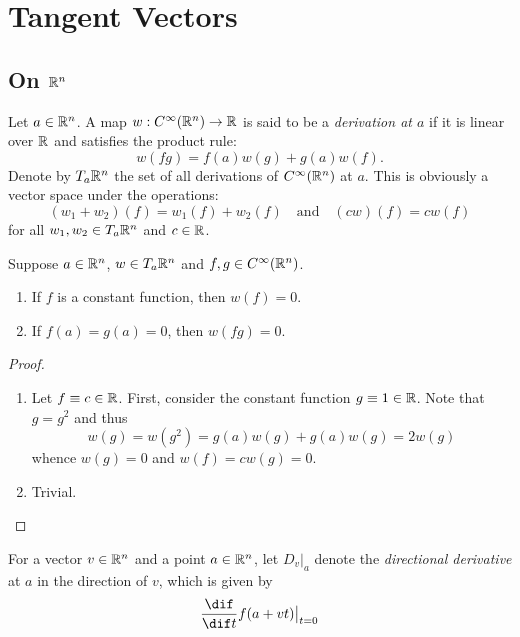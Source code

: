 \section{Tangent Vectors}
\subsection{On \texorpdfstring{$\mathbb{R}^n$}{Rn}}

\begin{definition}
    Let $a\in\mathbb{R}^n$. A map $w: C^\infty(\mathbb{R}^n)\to\mathbb{R}$ is said to be a \emph{derivation at $a$} if it is linear over $\mathbb{R}$ and satisfies the product rule: 
    \begin{equation*}
        w(fg) = f(a)w(g) + g(a)w(f).
    \end{equation*}
    Denote by $T_a\mathbb{R}^n$ the set of all derivations of $C^{\infty}(\mathbb{R}^n)$ at $a$. This is obviously a vector space under the operations: 
    \begin{equation*}
        (w_1 + w_2)(f) = w_1(f) + w_2(f)\quad\text{and}\quad (cw)(f) = cw(f)
    \end{equation*}
    for all $w_1,w_2\in T_a\mathbb{R}^n$ and $c\in\mathbb{R}$.
\end{definition}

\begin{lemma}
    Suppose $a\in\mathbb{R}^n$, $w\in T_a\mathbb{R}^n$ and $f,g\in C^\infty(\mathbb{R}^n)$. 
    \begin{enumerate}[label=(\alph*)]
        \item If $f$ is a constant function, then $w(f) = 0$. 
        \item If $f(a) = g(a) = 0$, then $w(fg) = 0$.
    \end{enumerate}
\end{lemma}
\begin{proof}
\begin{enumerate}[label=(\alph*)]
    \item Let $f\equiv c\in\mathbb{R}$. First, consider the constant function $g\equiv 1\in\mathbb{R}$. Note that $g = g^2$ and thus 
    \begin{equation*}
        w(g) = w(g^2) = g(a)w(g) + g(a)w(g) = 2w(g)
    \end{equation*}
    whence $w(g) = 0$ and $w(f) = cw(g) = 0$.

    \item Trivial.\qedhere
\end{enumerate}
\end{proof}

For a vector $v\in\mathbb{R}^n$ and a point $a\in\mathbb{R}^n$, let $D_v|_a$ denote the \emph{directional derivative} at $a$ in the direction of $v$, which is given by 
\begin{equation*}
    \frac{\dif}{\dif t}f(a + vt)\big|_{t = 0}
\end{equation*}

